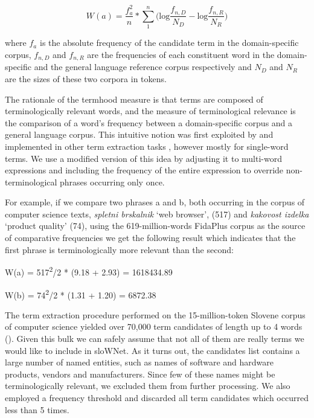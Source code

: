 \documentclass[output=paper]{LSP/langsci}
\begin{document}
$$
{W(a)=\frac{f_{{a}}^{{2}}}{n}\ast \overset{{n}}{\underset{{1}}{\sum }}{(\text{log}\frac{f_{{n,D}}}{N_{{D}}}}-\text{log}\frac{f_{{n,R}}}{N_{{R}}})}
$$

\noindent where $f_a$ is the absolute frequency of the candidate term in the domain-specific corpus, $f_{n,D}$ and $f_{n,R}$ are the frequencies of each constituent word in the domain-specific and the general language reference corpus respectively and $N_D$ and $N_R$ are the sizes of these two corpora in tokens. 

The rationale of the termhood measure is that terms are composed of terminologically relevant words, and the measure of terminological relevance is the comparison of a word's frequency between a domain-specific corpus and a general language corpus. This intuitive notion was first exploited by \citet{AhmadEtAl1992} and implemented in other term extraction tasks \citep{Scott1998, HeidEtAl2001}, however mostly for single-word terms. We use a modified version of this idea by adjusting it to multi-word expressions and including the frequency of the entire expression to override non-terminological phrases occurring only once. 

For example, if we compare two phrases a and b, both occurring in the corpus of computer science texts, \textit{spletni brskalnik} `web browser', (517) and \textit{kakovost izdelka} `product quality' (74), using the 619-million-words FidaPlus corpus as the source of comparative frequencies we get the following result which indicates that the first phrase is terminologically more relevant than the second:

\ea
\label{vintarfiser:ex:a}
W(a) = 517\textsuperscript{2}/2 * (9.18 + 2.93) = 1618434.89
\z

\ea
\label{vintarfiser:ex:b}
W(b) = 74\textsuperscript{2}/2 * (1.31 + 1.20) = 6872.38
\z

The term extraction procedure performed on the 15-million-token Slovene corpus of computer science yielded over 70,000 term candidates of length up to 4 words (). Given this bulk we can safely assume that not all of them are really terms we would like to include in sloWNet. As it turns out, the candidates list contains a large number of named entities, such as names of software and hardware products, vendors and manufacturers. Since few of these names might be terminologically relevant, we excluded them from further processing. We also employed a frequency threshold and discarded all term candidates which occurred less than 5 times. 
\end{document}
